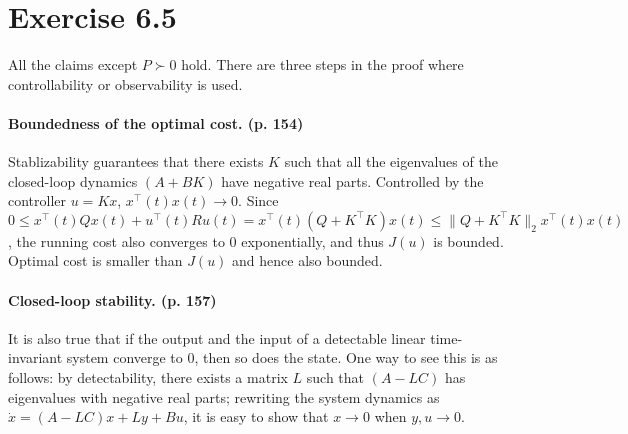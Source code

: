 \documentclass[11pt]{report}
\newcommand{\T}{\intercal}
\begin{document}
\section*{Exercise 6.5}
All the claims except $P \succ 0$ hold. There are three steps in the proof where controllability or observability is used.

\paragraph{Boundedness of the optimal cost. (p. 154)} Stablizability guarantees that there exists $K$ such that all the eigenvalues of the closed-loop dynamics $(A+BK)$ have negative real parts. Controlled by the controller $u = Kx$, $x^\T(t)x(t) \to 0$. Since $0 \leq x^\T(t)Qx(t) + u^\T(t)Ru(t) = x^\T(t)(Q+K^\T K)x(t) \leq \|Q+K^\T K\|_2 x^\T(t)x(t)$, the running cost also converges to $0$ exponentially, and thus $J(u)$ is bounded. Optimal cost is smaller than $J(u)$ and hence also bounded.

\paragraph{Closed-loop stability. (p. 157)} It is also true that if the output and the input of a detectable linear time-invariant system converge to $0$, then so does the state. One way to see this is as follows:
by detectability, there exists a matrix $L$ such that $(A - LC)$ has eigenvalues with negative real parts; rewriting the system dynamics as $\dot{x} = (A - LC)x + Ly + Bu$, it is easy to show that $x \to 0$ when $y, u \to 0$.
\end{document}
